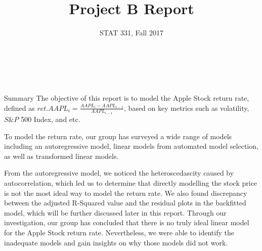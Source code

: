 \documentclass[]{article}
\title{\bf{Project B Report}}
\subtitle{STAT 331, Fall 2017}
\author{\text{Rosie Zou (20588049)} \\ \text{Simon Guo (20600133)} \\ \text{Azoacha Forcheh (20558994)}}
\date{}
\begin{document}
\maketitle

\begin{section}{Summary}
The objective of this report is to model the Apple Stock return rate, defined as $ret.AAPL_i = \frac{AAPL_i - AAPL_{i-1}}{AAPL_{i-1}}$, based on key metrics such as volatility, $S\&P$ 500 Index, and etc. 

To model the return rate, our group has surveyed a wide range of models including an autoregressive model, linear models from automated model selection, as well as transformed linear models. 

From the autoregressive model, we noticed the heteroscedascity caused by autocorrelation, which led us to determine that directly modelling the stock price is not the most ideal way to model the return rate. We also found discrepancy between the adjusted R-Squared value and the residual plots in the backfitted model, which will be further discussed later in this report. Through our investigation, our group has concluded that there is no truly ideal linear model for the Apple Stock return rate. Nevertheless, we were able to identify the inadequate models and gain insights on why those models did not work.
\end{section}
\end{document}
